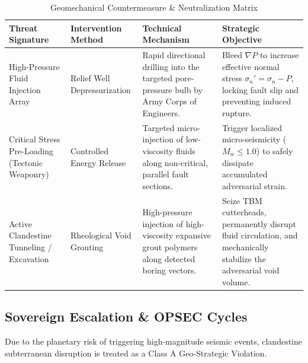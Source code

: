 \documentclass[11pt,a4paper]{article}
\begin{document}
\begin{table}[htbp]
\centering
\caption{Geomechanical Countermeasure \& Neutralization Matrix}
\label{tab:countermeasures}
\small
\begin{tabularx}{\textwidth}{>{\raggedright\arraybackslash}p{3cm} >{\raggedright\arraybackslash}p{3.5cm} >{\raggedright\arraybackslash}X >{\raggedright\arraybackslash}p{3.5cm}}
\toprule
\textbf{Threat Signature} & \textbf{Intervention Method} & \textbf{Technical Mechanism} & \textbf{Strategic Objective} \\
\midrule
High-Pressure Fluid Injection Array & Relief Well Depressurization & Rapid directional drilling into the targeted pore-pressure bulb by Army Corps of Engineers. & Bleed $\nabla P$ to increase effective normal stress $\sigma_n' = \sigma_n - P$, locking fault slip and preventing induced rupture. \\
\midrule
Critical Stress Pre-Loading (Tectonic Weaponry) & Controlled Energy Release & Targeted micro-injection of low-viscosity fluids along non-critical, parallel fault sections. & Trigger localized micro-seismicity ($M_w \le 1.0$) to safely dissipate accumulated adversarial strain. \\
\midrule
Active Clandestine Tunneling / Excavation & Rheological Void Grouting & High-pressure injection of high-viscosity expansive grout polymers along detected boring vectors. & Seize TBM cutterheads, permanently disrupt fluid circulation, and mechanically stabilize the adversarial void volume. \\
\bottomrule
\end{tabularx}
\end{table}

\subsection{Sovereign Escalation \& OPSEC Cycles}
Due to the planetary risk of triggering high-magnitude seismic events, clandestine subterranean disruption is treated as a Class A Geo-Strategic Violation.
\end{document}
